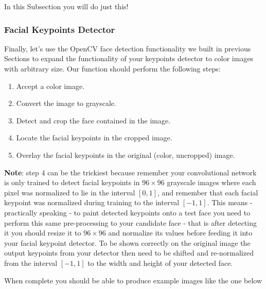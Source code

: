 \documentclass[11pt]{article}
\providecommand{\tightlist}{%
      \setlength{\itemsep}{0pt}\setlength{\parskip}{0pt}}
\begin{document}
In this Subsection you will do just this!

    \subsubsection{Facial Keypoints
Detector}\label{facial-keypoints-detector}

Finally, let's use the OpenCV face detection functionality we built in
previous Sections to expand the functionality of your keypoints detector
to color images with arbitrary size. Our function should perform the
following steps:

\begin{enumerate}
\def\labelenumi{\arabic{enumi}.}
\tightlist
\item
  Accept a color image.
\item
  Convert the image to grayscale.
\item
  Detect and crop the face contained in the image.
\item
  Locate the facial keypoints in the cropped image.
\item
  Overlay the facial keypoints in the original (color, uncropped) image.
\end{enumerate}

\textbf{Note}: step 4 can be the trickiest because remember your
convolutional network is only trained to detect facial keypoints in
\(96 \times 96\) grayscale images where each pixel was normalized to lie
in the interval \([0,1]\), and remember that each facial keypoint was
normalized during training to the interval \([-1,1]\). This means -
practically speaking - to paint detected keypoints onto a test face you
need to perform this same pre-processing to your candidate face - that
is after detecting it you should resize it to \(96 \times 96\) and
normalize its values before feeding it into your facial keypoint
detector. To be shown correctly on the original image the output
keypoints from your detector then need to be shifted and re-normalized
from the interval \([-1,1]\) to the width and height of your detected
face.

When complete you should be able to produce example images like the one
below
\end{document}
